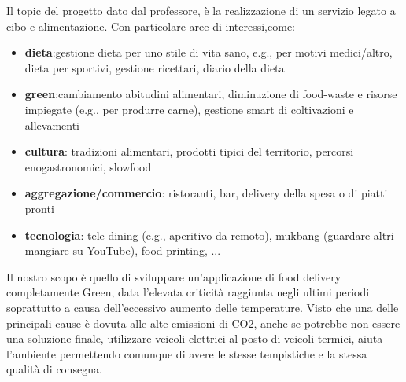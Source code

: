 \documentclass{article}
\begin{document}
Il topic del progetto dato dal professore, è la realizzazione di un servizio legato a cibo e alimentazione. Con particolare aree di interessi,come: \par
\begin{itemize}
    \item \textbf{dieta}:gestione dieta per uno stile di vita sano, e.g., per motivi medici/altro, dieta per sportivi, gestione ricettari, diario della dieta \par
    \item \textbf{green}:cambiamento abitudini alimentari, diminuzione di food-waste e risorse impiegate (e.g., per produrre carne), gestione smart di coltivazioni e allevamenti \par
    \item \textbf{cultura}: tradizioni alimentari, prodotti tipici del territorio, percorsi enogastronomici, slowfood\par
    \item \textbf{aggregazione/commercio}: ristoranti, bar, delivery della spesa o di piatti pronti \par
    \item \textbf{tecnologia}: tele-dining (e.g., aperitivo da remoto), mukbang (guardare altri mangiare su YouTube), food printing, ... \par
\end{itemize}
\vspace{1cm}



     \par
    Il nostro scopo è quello di sviluppare un’applicazione di food delivery completamente Green, data l'elevata criticità raggiunta negli ultimi periodi soprattutto a causa dell'eccessivo aumento delle temperature. Visto che una delle principali cause è dovuta alle alte emissioni di CO2, anche se potrebbe non essere una soluzione finale, utilizzare veicoli elettrici al posto di veicoli termici, aiuta l’ambiente permettendo comunque di avere le stesse tempistiche e la stessa qualità di consegna.
    \vspace{1cm}
    
\end{document}
